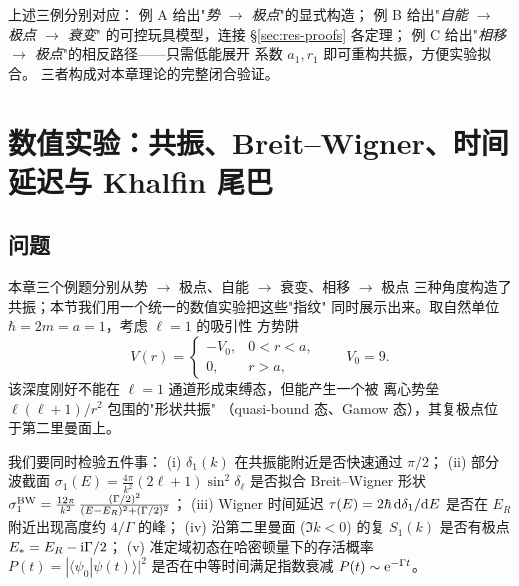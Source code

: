 \begin{remark}
  上述三例分别对应：
  例 A 给出"\emph{势 $\to$ 极点}"的显式构造；
  例 B 给出"\emph{自能 $\to$ 极点 $\to$ 衰变}"
    的可控玩具模型，连接 \S\ref{sec:res-proofs} 各定理；
  例 C 给出"\emph{相移 $\to$ 极点}"的相反路径——只需低能展开
    系数 $a_1, r_1$ 即可重构共振，方便实验拟合。
  三者构成对本章理论的完整闭合验证。
\end{remark}

\section{数值实验：共振、Breit--Wigner、时间延迟与 Khalfin 尾巴}\label{sec:numexp-ch14}

\subsection*{问题}
本章三个例题分别从势 $\to$ 极点、自能 $\to$ 衰变、相移 $\to$ 极点
三种角度构造了共振；本节我们用一个统一的数值实验把这些"指纹"
同时展示出来。取自然单位 $\hbar=2m=a=1$，考虑 $\ell=1$ 的吸引性
方势阱
\begin{equation*}
  V(r)=
  \begin{cases}
    -V_{0}, & 0<r<a,\\
    0,      & r>a,
  \end{cases}
  \qquad V_{0}=9.
\end{equation*}
该深度刚好不能在 $\ell=1$ 通道形成束缚态，但能产生一个被
离心势垒 $\ell(\ell+1)/r^{2}$ 包围的"形状共振"
（quasi-bound 态、Gamow 态），其复极点位于第二里曼面上。

我们要同时检验五件事：
(i) $\delta_{1}(k)$ 在共振能附近是否快速通过 $\pi/2$；
(ii) 部分波截面 $\sigma_{1}(E)=\frac{4\pi}{k^{2}}(2\ell+1)\sin^{2}\delta_{\ell}$
是否拟合 Breit--Wigner 形状
$\sigma_{1}^{\rm BW}=\frac{12\pi}{k^{2}}\,\frac{(\Gamma/2)^{2}}{(E-E_{R})^{2}+(\Gamma/2)^{2}}$；
(iii) Wigner 时间延迟 $\tau(E)=2\hbar\,\mathrm{d}\delta_{1}/\mathrm{d} E$
是否在 $E_{R}$ 附近出现高度约 $4/\Gamma$ 的峰；
(iv) 沿第二里曼面 ($\Im k<0$) 的复 $S_{1}(k)$
是否有极点 $E_{*}=E_{R}-\mathrm{i}\Gamma/2$；
(v) 准定域初态在哈密顿量下的存活概率
$P(t)=|\langle\psi_{0}|\psi(t)\rangle|^{2}$
是否在中等时间满足指数衰减
$P(t)\sim \mathrm{e}^{-\Gamma t}$。


